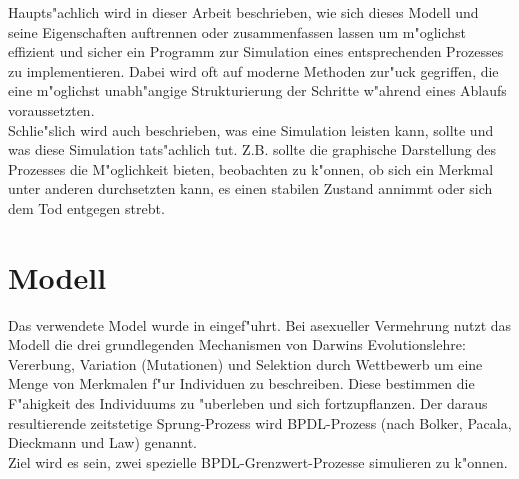 \documentclass[11pt, a4paper, german]{article}
\theoremstyle{plain}
\begin{document}
Haupts"achlich wird in dieser Arbeit beschrieben, wie sich dieses Modell und seine Eigenschaften auftrennen oder zusammenfassen lassen um m"oglichst effizient und sicher ein Programm zur Simulation eines entsprechenden Prozesses zu implementieren. Dabei wird oft auf moderne Methoden zur"uck gegriffen, die eine m"oglichst unabh"angige Strukturierung der Schritte w"ahrend eines Ablaufs voraussetzten.\\
Schlie"slich wird auch beschrieben, was eine Simulation leisten kann, sollte und was diese Simulation tats"achlich tut. Z.B. sollte die graphische Darstellung des Prozesses die M"oglichkeit bieten, beobachten zu k"onnen, ob sich ein Merkmal unter anderen durchsetzten kann, es einen stabilen Zustand annimmt oder sich dem Tod entgegen strebt.


\clearpage
\section{Modell}
Das verwendete Model wurde in \cite{Bolker_Spatial_moment,Bolker1997179,raey_Dieckmann_Law} eingef"uhrt. Bei asexueller Vermehrung nutzt das Modell die drei grundlegenden Mechanismen von Darwins Evolutionslehre: Vererbung, Variation (Mutationen) und Selektion durch Wettbewerb um eine Menge von Merkmalen f"ur Individuen zu beschreiben. Diese bestimmen die F"ahigkeit des Individuums zu "uberleben und sich fortzupflanzen. Der daraus resultierende zeitstetige Sprung-Prozess wird BPDL-Prozess (nach Bolker, Pacala, Dieckmann und Law) genannt.\\
Ziel wird es sein, zwei spezielle BPDL-Grenzwert-Prozesse simulieren zu k"onnen.
\end{document}
